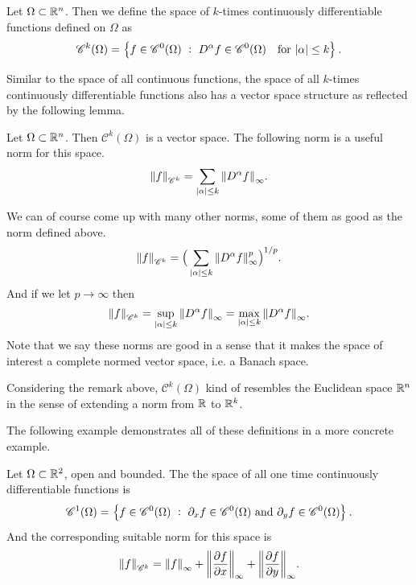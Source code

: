 \begin{definition}
	Let $ \Omega \subset \mathbb{R}^n $. Then we define the space of $ k $-times continuously differentiable functions defined on $ \Omega $ as 
	\[ \mathscr{C}^k(\Omega) = \left\{ f \in \mathscr{C}^0(\Omega)\ :\ D^\alpha f \in \mathscr{C}^0(\Omega) \quad \text{for}\ |\alpha| \leq k    \right\}. \]
\end{definition}

Similar to the space of all continuous functions, the space of all $ k $-times continuously differentiable functions also has a vector space structure as reflected by the following lemma.

\begin{lemma}
	Let $ \Omega \subset \mathbb{R}^n $. Then $ \mathscr{C}^k(\Omega) $ is a vector space. The following norm is a useful norm for this space. 
	\[  \norm{f}_{\mathscr{C}^k} = \sum_{|\alpha| \leq k} \norm{D^\alpha f}_\infty. \]
\end{lemma}
\begin{remark}
	We can of course come up with many other norms, some of them as good as the norm defined above. 
	\[ \norm{f}_{\mathscr{C}^k} = \big(\sum_{|\alpha| \leq k} \norm{D^\alpha f}^p_\infty \big)^{1/p}. \]
	And if we let $ p \to \infty $ then 
	\[ \norm{f}_{\mathscr{C}^k} = \sup_{|\alpha|\leq k} \norm{D^\alpha f}_\infty = \max_{|\alpha|\leq k} \norm{D^\alpha f}_\infty. \]
	Note that we say these norms are good in a sense that it makes the space of interest a complete normed vector space, i.e. a Banach space. 
\end{remark}

\begin{observation}
	Considering the remark above, $ \mathscr{C}^k(\Omega) $ kind of resembles the Euclidean space $ \mathbb{R}^n $ in the sense of extending a norm from $ \mathbb{R} $ to $ \mathbb{R}^k $.
\end{observation}

The following example demonstrates all of these definitions in a more concrete example.

\begin{example}
	Let $ \Omega \subset \mathbb{R}^2 $, open and bounded. The the space of all one time continuously differentiable functions is
	\[ \mathscr{C}^1(\Omega) = \left\{ f\in \mathscr{C}^0(\Omega)\ :\ \partial_{x}f \in \mathscr{C}^0(\Omega)\ \text{and}\ \partial_y f \in \mathscr{C}^0(\Omega) \right\}. \]
	And the corresponding suitable norm for this space is
	\[ \norm{f}_{\mathscr{C}^k} = \norm{f}_\infty  + \norm{\frac{\partial f}{\partial x}}_\infty + \norm{\frac{\partial f}{\partial y}}_\infty. \]
\end{example}

